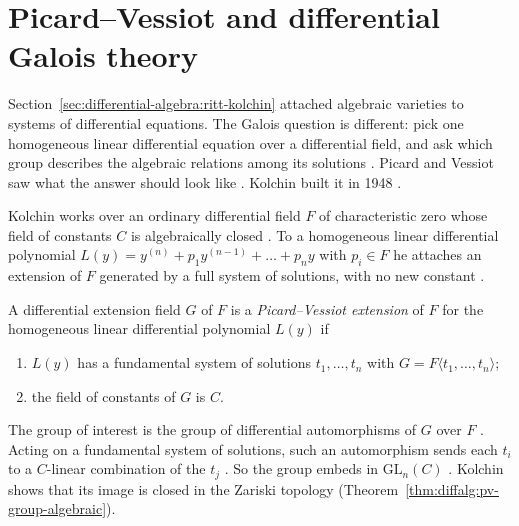 \section{Picard--Vessiot and differential Galois theory}\label{sec:differential-algebra:differential-galois}

Section~\ref{sec:differential-algebra:ritt-kolchin} attached algebraic
varieties to systems of differential equations. The Galois question is
different: pick one homogeneous linear differential equation over a
differential field, and ask which group describes the algebraic relations
among its solutions \cite[pp.~1--6]{Kolchin1948PicardVessiot}. Picard and
Vessiot saw what the answer should look like
\cite[pp.~1--2]{Kolchin1948PicardVessiot}. Kolchin built it in 1948
\cite[pp.~1--6]{Kolchin1948PicardVessiot}.

Kolchin works over an ordinary differential field $F$ of characteristic
zero whose field of constants $C$ is algebraically closed
\cite[p.~29]{Kolchin1948PicardVessiot}. To a homogeneous linear
differential polynomial $L(y) = y^{(n)} + p_1 y^{(n-1)} + \dots + p_n y$
with $p_i\in F$ he attaches an extension of $F$ generated by a full
system of solutions, with no new constant
\cite[p.~29]{Kolchin1948PicardVessiot}.

\begin{definition}\label{def:diffalg:pv-extension}
A differential extension field $G$ of $F$ is a \emph{Picard--Vessiot
extension} of $F$ for the homogeneous linear differential polynomial
$L(y)$ if
\begin{enumerate}
\item $L(y)$ has a fundamental system of solutions $t_1, \dots, t_n$ with
  $G = F\langle t_1, \dots, t_n\rangle$;
\item the field of constants of $G$ is $C$.
\end{enumerate}
\end{definition}

The group of interest is the group of differential automorphisms of $G$
over $F$ \cite[pp.~29--31]{Kolchin1948PicardVessiot}. Acting on a
fundamental system of solutions, such an automorphism sends each $t_i$ to
a $C$-linear combination of the $t_j$ \cite[p.~29]{Kolchin1948PicardVessiot}.
So the group embeds in $\mathrm{GL}_n(C)$
\cite[p.~29]{Kolchin1948PicardVessiot}. Kolchin shows that its image is
closed in the Zariski topology (Theorem~\ref{thm:diffalg:pv-group-algebraic}).

